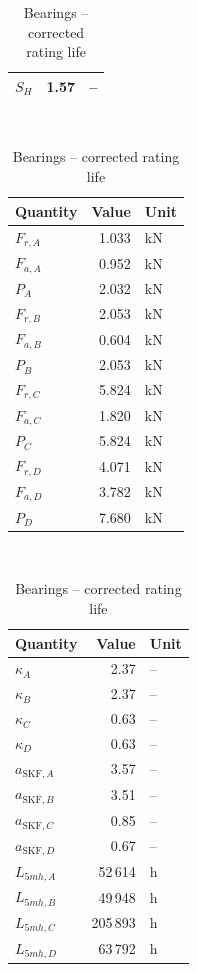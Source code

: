 \documentclass[11pt,a4paper]{article}
\begin{document}
\begin{table}[H]
\begin{minipage}[t]{0.48\textwidth}
\begin{tabular}{lrl}
$S_H$ & 1.57 & -- \\
\bottomrule
\end{tabular}\\[10pt]
\caption*{Bearings -- loads}
\begin{tabular}{lrl}
\toprule
Quantity & Value & Unit \\
\midrule
$F_{r,A}$ & 1.033 & kN \\
$F_{a,A}$ & 0.952 & kN \\
$P_{A}$ & 2.032 & kN \\
$F_{r,B}$ & 2.053 & kN \\
$F_{a,B}$ & 0.604 & kN \\
$P_{B}$ & 2.053 & kN \\
$F_{r,C}$ & 5.824 & kN \\
$F_{a,C}$ & 1.820 & kN \\
$P_{C}$ & 5.824 & kN \\
$F_{r,D}$ & 4.071 & kN \\
$F_{a,D}$ & 3.782 & kN \\
$P_{D}$ & 7.680 & kN \\
\bottomrule
\end{tabular}\\[10pt]
\caption*{Bearings -- corrected rating life}
\begin{tabular}{lrl}
\toprule
Quantity & Value & Unit \\
\midrule
$\kappa_A$ & 2.37 & -- \\
$\kappa_B$ & 2.37 & -- \\
$\kappa_C$ & 0.63 & -- \\
$\kappa_D$ & 0.63 & -- \\
$a_{\mathrm{SKF},A}$ & 3.57 & -- \\
$a_{\mathrm{SKF},B}$ & 3.51 & -- \\
$a_{\mathrm{SKF},C}$ & 0.85 & -- \\
$a_{\mathrm{SKF},D}$ & 0.67 & -- \\
$L_{5mh,A}$ & 52\,614 & h \\
$L_{5mh,B}$ & 49\,948 & h \\
$L_{5mh,C}$ & 205\,893 & h \\
$L_{5mh,D}$ & 63\,792 & h \\
\bottomrule
\end{tabular}
\end{minipage}
\end{table}

\appendix
\end{document}
